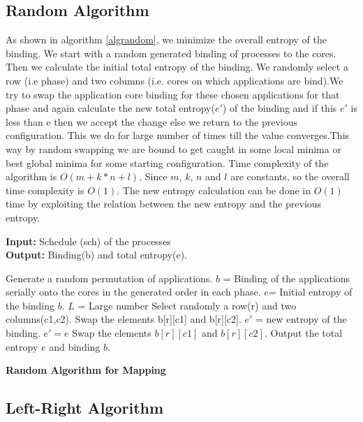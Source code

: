 \documentclass[10pt, conference]{IEEEtran}
\begin{document}
\subsection{Random Algorithm}
As shown in algorithm \ref{algrandom}, we minimize the overall entropy of the binding. We start with a random generated binding of processes to the cores. Then we calculate the initial total entropy of the binding. We randomly select a row (i.e phase) and two columns (i.e. cores on which applications are bind).We try to swap the application core binding for these chosen applications for that phase and again calculate the new total entropy($e'$) of the binding and if this $e'$ is less than e then we accept the change else we return to the previous configuration. This we do for large number of times till the value converges.This way by random swapping we are bound to get caught in some local minima or best global minima for some starting configuration. Time complexity of the algorithm is $O(m + k*n + l)$. Since $m$, $k$, $n$ and $l$ are constants, so the overall time complexity is $O(1)$. The new entropy calculation can be done in $O(1)$ time by exploiting the relation between the new entropy and the previous entropy.

\begin{algorithm}[tb]
\footnotesize
\textbf{Input:} Schedule (sch) of the processes \ \\
\textbf{Output:} Binding(b) and total entropy(e).
\begin{algorithmic}[1]
\STATE  Generate a random permutation of applications.  
\STATE  $b$ = Binding of the applications serially onto the cores in the generated order in each phase.
\STATE  $e$=  Initial entropy of the binding $b$.
\STATE  $L$ = Large number
\STATE Select randomly a row(r) and two columns(c1,c2).
\STATE Swap the elements b[r][c1] and b[r][c2].
\STATE $e'$ = new entropy of the binding.
\STATE $e' = e$
\ELSE
\STATE Swap the elements $b[r][c1]$ and $b[r][c2]$.
\ENDIF
\ENDFOR
\STATE Output the total entropy $e$ and binding $b$.
\end{algorithmic}
\caption{\textbf{Random Algorithm for Mapping}}
\vspace{-0.1cm}
\label{algrandom}
\end{algorithm}

\subsection{Left-Right Algorithm}
\end{document}

